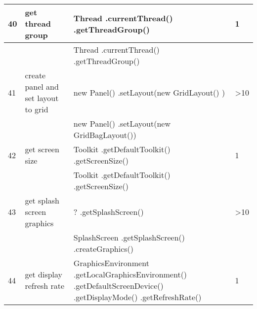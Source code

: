 \begin{longtable}{|p{}|p{}|p{}|p{}|}
		\rowcolor[HTML]{FFCCC9} 
		40                                & get thread group                                       & Thread .currentThread() .getThreadGroup()                                                                        & 1                                       \\ \hline
		\rowcolor[HTML]{9AFF99} 
		&                                                        & Thread .currentThread() .getThreadGroup()                                                                        &                                         \\ \hline
		\rowcolor[HTML]{FFCCC9} 
		41                                & create panel and set layout to grid                    & new Panel()  .setLayout(new GridLayout() )                                                                       & \textgreater{}10                        \\ \hline
		\rowcolor[HTML]{9AFF99} 
		&                                                        & new Panel() .setLayout(new GridBagLayout())                                                                      &                                         \\ \hline
		\rowcolor[HTML]{FFCCC9} 
		42                                & get screen size                                        & Toolkit .getDefaultToolkit() .getScreenSize()                                                                    & 1                                       \\ \hline
		\rowcolor[HTML]{9AFF99} 
		&                                                        & Toolkit .getDefaultToolkit() .getScreenSize()                                                                    &                                         \\ \hline
		\rowcolor[HTML]{FFCCC9} 
		43                                & get splash screen graphics                             & ? .getSplashScreen()                                                                                             & \textgreater{}10                        \\ \hline
		\rowcolor[HTML]{9AFF99} 
		&                                                        & SplashScreen .getSplashScreen() .createGraphics()                                                                &                                         \\ \hline
		\rowcolor[HTML]{FFCCC9} 
		44                                & get display refresh rate                               & GraphicsEnvironment .getLocalGraphicsEnvironment() .getDefaultScreenDevice() .getDisplayMode() .getRefreshRate() & 1                                       \\ \hline

\end{longtable}
